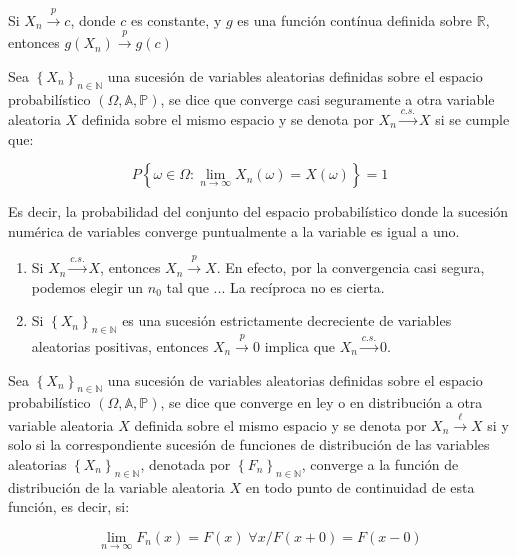 \begin{corolario}
Si $X_{n} \overset{p}{\to} c $, donde $c$ es constante, y $g$ es una funci\'on cont\'inua definida sobre $\mathbb{R}$, entonces $g(X_{n}) \overset{p}{\to} g(c) $
\end{corolario}

\begin{definicion}
Sea $ \left\{X_n\right\}_{n\in\mathbb{N}} $ una sucesi\'on de variables aleatorias definidas sobre el espacio probabil\'istico $\left(\Omega,\mathbb{A}, \mathbb{P}\right) $, se dice que converge casi seguramente a otra variable aleatoria $X$ definida sobre el mismo espacio y se denota por $X_{n} \overset{c.s.}{\to} X $ si se cumple que:

\begin{equation}
P\left\{ \omega\in\Omega:\lim_{n\to\infty}X_{n}(\omega)=X(\omega)\right\}=1
\end{equation}

\end{definicion}

Es decir, la probabilidad del conjunto del espacio probabil\'istico donde la sucesi\'on num\'erica de variables converge puntualmente a la variable es igual a uno.

\begin{enumerate}
\item Si $X_{n} \overset{c.s.}{\to} X $, entonces $X_{n} \overset{p}{\to} X $. En efecto, por la convergencia casi segura, podemos elegir un $n_0$ tal que ... La rec\'iproca no es cierta.
\item Si  $ \left\{X_n\right\}_{n\in\mathbb{N}} $ es una sucesi\'on estrictamente decreciente de variables aleatorias positivas, entonces $X_{n} \overset{p}{\to} 0$ implica que $X_{n} \overset{c.s.}{\to} 0 $.
\end{enumerate}

\begin{definicion}
Sea $ \left\{X_n\right\}_{n\in\mathbb{N}}$ una sucesi\'on de variables aleatorias definidas sobre el espacio probabil\'istico $\left(\Omega,\mathbb{A}, \mathbb{P}\right) $, se dice que converge en ley o en distribuci\'on a otra variable aleatoria $X$ definida sobre el mismo espacio y se denota por $X_{n} \overset{\ell}{\to} X $ si y solo si la correspondiente sucesi\'on de funciones de distribuci\'on de las variables aleatorias $ \left\{X_n\right\}_{n\in\mathbb{N}}$, denotada por $ \left\{F_n\right\}_{n\in\mathbb{N}} $, converge a la funci\'on de distribuci\'on de la variable aleatoria $X$ en todo punto de continuidad de esta funci\'on, es  decir, si:

\begin{equation}
\lim_{n\to\infty}F_n(x)=F(x)\;\forall x/F(x+0)=F(x-0)
\end{equation}

\end{definicion}

